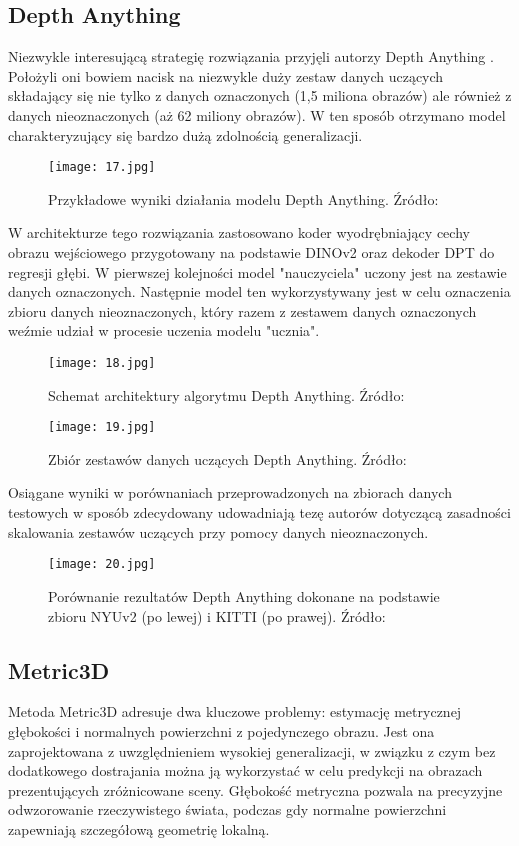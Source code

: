 \subsection{Depth Anything}
Niezwykle interesującą strategię rozwiązania przyjęli autorzy Depth Anything \cite{yang2024}. Położyli oni bowiem nacisk na niezwykle duży zestaw danych uczących składający się nie tylko z danych oznaczonych (1,5 miliona obrazów) ale również z danych nieoznaczonych (aż 62 miliony obrazów). W ten sposób otrzymano model charakteryzujący się bardzo dużą zdolnością generalizacji.
\begin{figure}[H]
    \centering
    \texttt{[image: 17.jpg]}
    \caption{Przykładowe wyniki działania modelu Depth Anything. Źródło: \cite{yang2024}}
    \label{depth-anything}
\end{figure}
W architekturze tego rozwiązania zastosowano koder wyodrębniający cechy obrazu wejściowego przygotowany na podstawie DINOv2 \cite{oquab2024} oraz dekoder DPT do regresji głębi. W pierwszej kolejności model "nauczyciela" uczony jest na zestawie danych oznaczonych. Następnie model ten wykorzystywany jest w celu oznaczenia zbioru danych nieoznaczonych, który razem z zestawem danych oznaczonych weźmie udział w procesie uczenia modelu "ucznia".
\begin{figure}[H]
    \centering
    \texttt{[image: 18.jpg]}
    \caption{Schemat architektury algorytmu Depth Anything. Źródło: \cite{yang2024}}
    \label{fig:depth-anything-schema}
\end{figure}
\begin{figure}[H]
    \centering
    \texttt{[image: 19.jpg]}
    \caption{Zbiór zestawów danych uczących Depth Anything. Źródło: \cite{yang2024}}
    \label{fig:depth-anything-data}
\end{figure}
Osiągane wyniki w porównaniach przeprowadzonych na zbiorach danych testowych w sposób zdecydowany udowadniają tezę autorów dotyczącą zasadności skalowania zestawów uczących przy pomocy danych nieoznaczonych.
\begin{figure}[H]
    \centering
    \texttt{[image: 20.jpg]}
    \caption{Porównanie rezultatów Depth Anything dokonane na podstawie zbioru NYUv2 (po lewej) i KITTI (po prawej). Źródło: \cite{yang2024}}
    \label{fig:depth-anything-results}
\end{figure}

\subsection{Metric3D}
Metoda Metric3D \cite{hu2024} adresuje dwa kluczowe problemy: estymację metrycznej głębokości i normalnych powierzchni z pojedynczego obrazu. Jest ona zaprojektowana z uwzględnieniem wysokiej generalizacji, w związku z czym bez dodatkowego dostrajania można ją wykorzystać w celu predykcji na obrazach prezentujących zróżnicowane sceny.
Głębokość metryczna pozwala na precyzyjne odwzorowanie rzeczywistego świata, podczas gdy normalne powierzchni zapewniają szczegółową geometrię lokalną.

